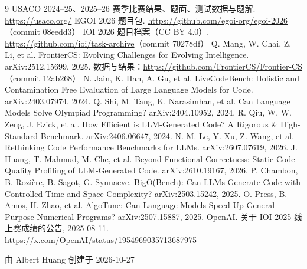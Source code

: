 \documentclass[11pt,a4paper,fontset=none]{ctexart}
\begin{document}
\begin{thebibliography}{9}\small
{} USACO 2024--25、2025--26 赛季比赛结果、题面、测试数据与题解. \url{https://usaco.org/}
 EGOI 2026 题目包. \url{https://github.com/egoi-org/egoi-2026}（commit 08eedd3）
 IOI 2026 题目档案（CC BY 4.0）. \url{https://github.com/ioi/task-archive}（commit 70278df）
 Q. Mang, W. Chai, Z. Li, et al. FrontierCS: Evolving Challenges for Evolving Intelligence. arXiv:2512.15699, 2025. 数据与结果：\url{https://github.com/FrontierCS/Frontier-CS}（commit 12ab268）
 N. Jain, K. Han, A. Gu, et al. LiveCodeBench: Holistic and Contamination Free Evaluation of Large Language Models for Code. arXiv:2403.07974, 2024.
 Q. Shi, M. Tang, K. Narasimhan, et al. Can Language Models Solve Olympiad Programming? arXiv:2404.10952, 2024.
 R. Qiu, W. W. Zeng, J. Ezick, et al. How Efficient is LLM-Generated Code? A Rigorous \& High-Standard Benchmark. arXiv:2406.06647, 2024.
 N. M. Le, Y. Xu, Z. Wang, et al. Rethinking Code Performance Benchmarks for LLMs. arXiv:2607.07619, 2026.
 J. Huang, T. Mahmud, M. Che, et al. Beyond Functional Correctness: Static Code Quality Profiling of LLM-Generated Code. arXiv:2610.19167, 2026.
 P. Chambon, B. Rozière, B. Sagot, G. Synnaeve. BigO(Bench): Can LLMs Generate Code with Controlled Time and Space Complexity? arXiv:2503.15242, 2025.
 O. Press, B. Amos, H. Zhao, et al. AlgoTune: Can Language Models Speed Up General-Purpose Numerical Programs? arXiv:2507.15887, 2025.
 OpenAI. 关于 IOI 2025 线上赛成绩的公告, 2025-08-11. \url{https://x.com/OpenAI/status/1954969035713687975}
\end{thebibliography}

\par\vspace{2em}\begin{flushright}由 Albert Huang 创建于 2026-10-27\end{flushright}
\end{document}
